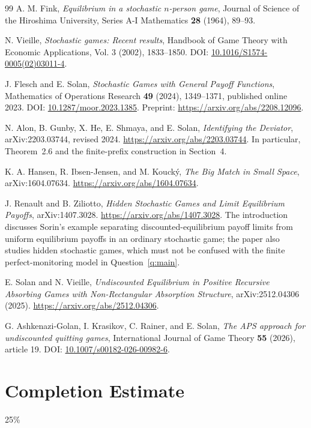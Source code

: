 \documentclass[11pt,a4paper]{article}
\numberwithin{equation}{section}
\theoremstyle{definition}
\theoremstyle{remark}
\begin{document}
\begin{thebibliography}{99}
A. M. Fink, \emph{Equilibrium in a stochastic $n$-person game},
Journal of Science of the Hiroshima University, Series A-I Mathematics
\textbf{28} (1964), 89--93.

N. Vieille, \emph{Stochastic games: Recent results},
Handbook of Game Theory with Economic Applications, Vol. 3 (2002),
1833--1850. DOI: \href{https://doi.org/10.1016/S1574-0005(02)03011-4}{10.1016/S1574-0005(02)03011-4}.

J. Flesch and E. Solan, \emph{Stochastic Games with General Payoff Functions},
Mathematics of Operations Research \textbf{49} (2024), 1349--1371,
published online 2023.
DOI: \href{https://doi.org/10.1287/moor.2023.1385}{10.1287/moor.2023.1385}.
Preprint: \url{https://arxiv.org/abs/2208.12096}.

N. Alon, B. Gunby, X. He, E. Shmaya, and E. Solan,
\emph{Identifying the Deviator}, arXiv:2203.03744, revised 2024.
\url{https://arxiv.org/abs/2203.03744}.
In particular, Theorem~2.6 and the finite-prefix construction in Section~4.

K. A. Hansen, R. Ibsen-Jensen, and M. Kouck\'{y},
\emph{The Big Match in Small Space}, arXiv:1604.07634.
\url{https://arxiv.org/abs/1604.07634}.

J. Renault and B. Ziliotto,
\emph{Hidden Stochastic Games and Limit Equilibrium Payoffs},
arXiv:1407.3028.
\url{https://arxiv.org/abs/1407.3028}.
The introduction discusses Sorin's example separating discounted-equilibrium
payoff limits from uniform equilibrium payoffs in an ordinary stochastic game;
the paper also studies hidden stochastic games, which must not be confused with
the finite perfect-monitoring model in Question~\ref{q:main}.

E. Solan and N. Vieille,
\emph{Undiscounted Equilibrium in Positive Recursive Absorbing Games with
Non-Rectangular Absorption Structure}, arXiv:2512.04306 (2025).
\url{https://arxiv.org/abs/2512.04306}.

G. Ashkenazi-Golan, I. Krasikov, C. Rainer, and E. Solan,
\emph{The APS approach for undiscounted quitting games},
International Journal of Game Theory \textbf{55} (2026), article 19.
DOI: \href{https://doi.org/10.1007/s00182-026-00982-6}{10.1007/s00182-026-00982-6}.
\end{thebibliography}
\section{Completion Estimate}
25\%
\end{document}
